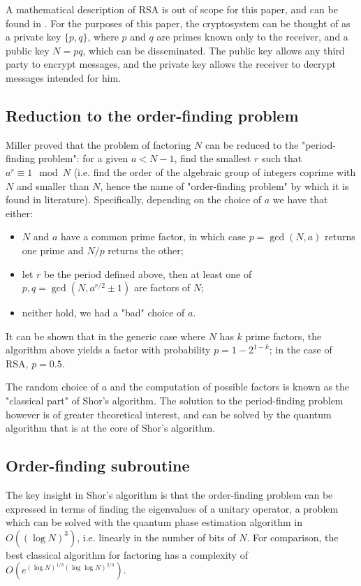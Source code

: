 \documentclass[conference]{IEEEtran}
\begin{document}
A mathematical description of RSA is out of scope for this paper, and can be found in \cite{rsa}. For the purposes of this paper, the cryptosystem can be thought of as a private key $\{p, q\}$, where $p$ and $q$ are primes known only to the receiver, and a public key $N=pq$, which can be disseminated. The public key allows any third party to encrypt messages, and the private key allows the receiver to decrypt messages intended for him.

\subsection{Reduction to the order-finding problem}
Miller \cite{miller} proved that the problem of factoring $N$ can be reduced to the "period-finding problem": for a given $a < N - 1$, find the smallest $r$ such that $a^r \equiv 1 \mod N$ (i.e. find the order of the algebraic group of integers coprime with $N$ and smaller than $N$, hence the name of "order-finding problem" by which it is found in literature). Specifically, depending on the choice of $a$ we have that either:
\begin{itemize}
\item $N$ and $a$ have a common prime factor, in which case $p=\gcd(N, a)$ returns one prime and $N/p$ returns the other;
\item let $r$ be the period defined above, then at least one of $p, q = \gcd(N, a^{r/2}\pm 1)$ are factors of $N$;
\item neither hold, we had a "bad" choice of $a$.
\end{itemize}

It can be shown that in the generic case where $N$ has $k$ prime factors, the algorithm above yields a factor with probability $p=1-2^{1-k}$; in the case of RSA, $p=0.5$.

The random choice of $a$ and the computation of possible factors is known as the "classical part" of Shor's algorithm. The solution to the period-finding problem however is of greater theoretical interest, and can be solved by the quantum algorithm that is at the core of Shor's algorithm.

\subsection{Order-finding subroutine}\label{order-finding}
The key insight in Shor's algorithm is that the order-finding problem can be expressed in terms of finding the eigenvalues of a unitary operator, a problem which can be solved with the quantum phase estimation algorithm in $O((\log N)^3)$, i.e. linearly in the number of bits of $N$. For comparison, the best classical algorithm for factoring has a complexity of $O(e^{(\log N)^{1/3}(\log\log N)^{2/3}})$.
\end{document}
